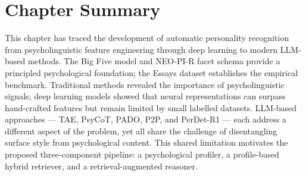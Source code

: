 \documentclass[../main.tex]{subfiles}
\begin{document}
\section{Chapter Summary}
\label{sec:litreview-summary}

This chapter has traced the development of automatic personality recognition from psycholinguistic feature engineering through deep learning to modern LLM-based methods. The Big Five model and NEO-PI-R facet schema provide a principled psychological foundation; the Essays dataset establishes the empirical benchmark. Traditional methods revealed the importance of psycholinguistic signals; deep learning models showed that neural representations can surpass hand-crafted features but remain limited by small labelled datasets. LLM-based approaches --- TAE, PsyCoT, PADO, P2P, and PerDet-R1 --- each address a different aspect of the problem, yet all share the challenge of disentangling surface style from psychological content. This shared limitation motivates the proposed three-component pipeline: a psychological profiler, a profile-based hybrid retriever, and a retrieval-augmented reasoner.
\end{document}
